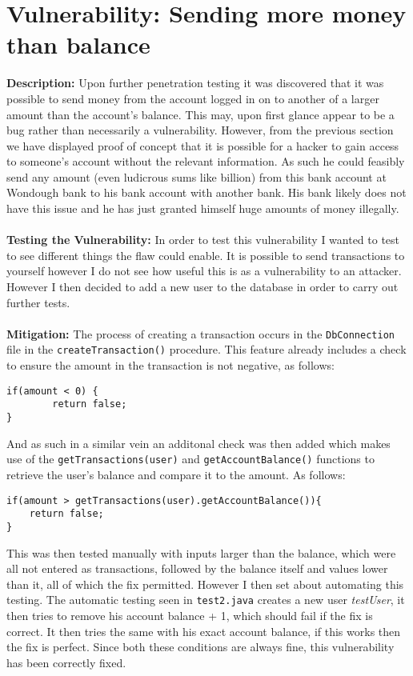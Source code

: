 \section{Vulnerability: Sending more money than balance}
\label{sec:background}
\textbf{Description:} Upon further penetration testing it was discovered that it was possible 
to send money from the account logged in on to another of a larger amount than the account's balance. This may, upon first glance appear to be a bug rather than
necessarily a vulnerability. However, from the previous section we have displayed proof of concept that it is possible for a hacker to gain access to someone's
account without the relevant information. As such he could feasibly send any amount (even ludicrous sums like  billion) from this bank account at Wondough bank
to his bank account with another bank. His bank likely does not have this issue and he has just granted himself huge amounts of money illegally. \\ \\
\textbf{Testing the Vulnerability:} In order to test this vulnerability I wanted to test to see different things the flaw could enable. It is possible to send
transactions to yourself however I do not see how useful this is as a vulnerability to an attacker. However I then decided to add a new user to the database in order
to carry out further tests. \\ \\
\textbf{Mitigation:} The process of creating a transaction occurs in the \verb|DbConnection| file in the \verb|createTransaction()| procedure. This feature already
includes a check to ensure the amount in the transaction is not negative, as follows:
\begin{verbatim}
if(amount < 0) {
        return false;
}
\end{verbatim}
And as such in a similar vein an additonal check was then added which makes use of the \verb|getTransactions(user)| and \verb|getAccountBalance()| functions to retrieve
the user's balance and compare it to the amount. As follows:
\begin{verbatim}
if(amount > getTransactions(user).getAccountBalance()){
    return false;
}
\end{verbatim}
This was then tested manually with inputs larger than the balance, which were all not entered as transactions, followed by the balance itself and values lower than it, all of
which the fix permitted. However I then set about automating this testing. The automatic testing seen in \verb|test2.java| creates a new user \textit{testUser}, it then tries
to remove his account balance + 1, which should fail if the fix is correct. It then tries the same with his exact account balance, if this works then the fix is perfect. Since
both these conditions are always fine, this vulnerability has been correctly fixed.
